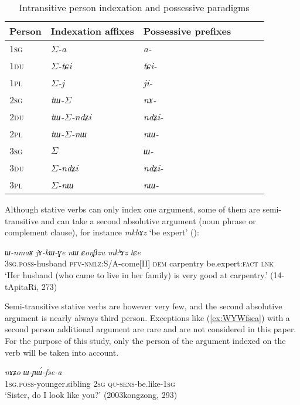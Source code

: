 \documentclass[oldfontcommands,oneside,a4paper,11pt]{article}
\newcommand{\ipa}[1]{{\phon\textit{#1}}} %
\newcommand{\refb}[1]{(\ref{#1})}
\newcommand{\ro}{$\Sigma$}
\begin{document}
\begin{table}[H]
\caption{Intransitive person indexation and possessive paradigms} \label{tab:indexation} \centering
\begin{tabular}{llllll}
\toprule 
Person & Indexation affixes & Possessive prefixes \\
\midrule
\textsc{1sg} & \ro{}\ipa{-a} & \ipa{a-} \\
\textsc{1du} & \ro{}\ipa{-tɕi} & \ipa{tɕi-} \\
\textsc{1pl} & \ro{}\ipa{-j} & \ipa{ji-} \\
\midrule
\textsc{2sg} & \ipa{tɯ-}\ro{} & \ipa{nɤ-} \\
\textsc{2du} & \ipa{tɯ-}\ro{}\ipa{-ndʑi} &\ipa{ndʑi-}\\
\textsc{2pl} & \ipa{tɯ-}\ro{}\ipa{-nɯ} & \ipa{nɯ-}\\
\midrule
\textsc{3sg} & \ro{} & \ipa{ɯ-} \\
\textsc{3du} & \ro{}\ipa{-ndʑi} & \ipa{ndʑi-}\\
\textsc{3pl} & \ro{}\ipa{-nɯ} &\ipa{nɯ-}  \\
\bottomrule
\end{tabular}
\end{table}

Although stative verbs can only index one argument, some of them are semi-transitive and can take a second absolutive argument (noun phrase or complement clause), for instance \ipa{mkhɤz} `be expert' (\citealt[275]{jacques16complementation}):

\begin{exe}
\ex \label{ex:CoNBzu.mkhAz}
\gll 
\ipa{ɯ-nmaʁ} 	\ipa{jɤ-kɯ-ɣe} 	\ipa{nɯ} 	\ipa{ɕoŋβzu} 	\ipa{mkʰɤz} 	\ipa{tɕe} \\
\textsc{3sg.poss}-husband \textsc{pfv-nmlz}:S/A-come[II] \textsc{dem} carpentry be.expert:\textsc{fact} \textsc{lnk} \\
\glt `Her husband (who came to live in her family) is very good at carpentry.' (14-tApitaRi, 273)
\end{exe}

Semi-transitive stative verbs are however very few, and the second absolutive argument is nearly always third person. Exceptions like \refb{ex:WYWfsea} with a second person additional argument are rare and are not considered in this paper. For the purpose of this study, only the person of the argument indexed on the verb will be taken into account.


\begin{exe}
\ex \label{ex:WYWfsea}
\gll \ipa{a-ʁi,} 	\ipa{nɤʑo} 	\ipa{ɯ-ɲɯ́-fse-a} \\
\textsc{1sg.poss}-younger.sibling \textsc{2sg} \textsc{qu-sens}-be.like-\textsc{1sg} \\
\glt `Sister, do I look like you?' (2003kongzong, 293)
\end{exe}
\end{document}
